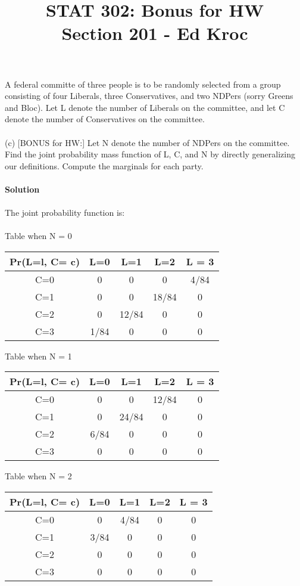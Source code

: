 \documentclass{article}
\title{STAT 302: Bonus for HW\\
Section 201 - Ed Kroc}
\begin{document}
	\maketitle

\noindent A federal committe of three people is to be randomly selected from a group consisting of four Liberals, three Conservatives, and two NDPers (sorry Greens and Bloc). Let L denote the number of Liberals on the committee, and let C denote the number of Conservatives on the committee.\\
\\
(c) [BONUS for HW:] Let N denote the number of NDPers on the committee. Find the joint probability mass function of L, C, and N by directly generalizing our definitions. Compute the marginals for each party.\\
\\
\textbf{Solution}\\
\\
The joint probability function is:\\
\\
Table when N = 0
\begin{center}
 \begin{tabular}{|| c c c c c ||} 
 \hline
 Pr(L=l, C= c) & L=0 & L=1 & L=2 & L = 3\\ [0.5ex] 
 \hline\hline
 C=0 & 0 & 0 & 0 & 4/84 \\ 
 \hline
 C=1 & 0 & 0 & 18/84 & 0 \\
 \hline
 C=2 & 0 & 12/84 & 0 & 0 \\
 \hline
 C=3 & 1/84 & 0 & 0 & 0 \\
 \hline
\end{tabular}
\end{center}
Table when N = 1
\begin{center}
 \begin{tabular}{|| c c c c c ||} 
 \hline
 Pr(L=l, C= c) & L=0 & L=1 & L=2 & L = 3\\ [0.5ex] 
 \hline\hline
 C=0 & 0 & 0 & 12/84 & 0 \\ 
 \hline
 C=1 & 0 & 24/84 & 0 & 0 \\
 \hline
 C=2 & 6/84 & 0 & 0 & 0 \\
 \hline
 C=3 & 0 & 0 & 0 & 0 \\
 \hline
\end{tabular}
\end{center}
Table when N = 2
\begin{center}
 \begin{tabular}{|| c c c c c ||} 
 \hline
 Pr(L=l, C= c) & L=0 & L=1 & L=2 & L = 3\\ [0.5ex] 
 \hline\hline
 C=0 & 0 & 4/84 & 0 & 0 \\ 
 \hline
 C=1 & 3/84 & 0 & 0 & 0 \\
 \hline
 C=2 & 0 & 0 & 0 & 0 \\
 \hline
 C=3 & 0 & 0 & 0 & 0 \\
 \hline
\end{tabular}
\end{center}
\end{document}
